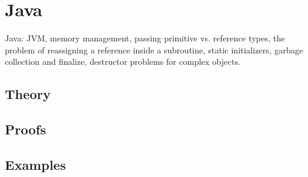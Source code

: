 
\section{Java}
\label{sec:2.3b.03-java}

\begin{ticket}
Java: JVM, memory management, passing primitive vs. reference types, the problem of reassigning a reference inside a subroutine, static initializers, garbage collection and finalize, destructor problems for complex objects.
\end{ticket}

\subsection*{Theory}

\subsection*{Proofs}

\subsection*{Examples}
